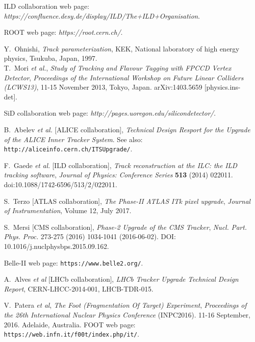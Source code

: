 \begin{thebibliography}{00}

 ILD collaboration web page: \\
{\it https://confluence.desy.de/display/ILD/The+ILD+Organisation}.

 ROOT web page: {\it https://root.cern.ch/}.

 Y.~Ohnishi, {\it Track  parameterization}, KEK, National laboratory of high energy physics, Tsukuba, Japan, 1997. \\

 T.~Mori {\it et al.}, {\it Study of Tracking and Flavour Tagging with FPCCD Vertex Detector}, 
{\it Proceedings of the International Workshop on Future Linear Colliders (LCWS13)}, 11-15 November 2013, Tokyo, Japan. 
arXiv:1403.5659 [physics.ins-det].

 SiD collaboration web page: {\it http://pages.uoregon.edu/silicondetector/}.

 B.~Abelev {\it et al.} [ALICE collaboration], {\it Technical Design Resport for the Upgrade of the ALICE Inner Tracker System}. 
See also: {\tt http://aliceinfo.cern.ch/ITSUpgrade/}.

 F.~Gaede {\it et al.} [ILD collaboration], {\it Track reconstruction at the ILC: the ILD tracking software}, 
{\it Journal of Physics: Conference Series} {\bf 513} (2014) 022011. doi:10.1088/1742-6596/513/2/022011.

 S.~Terzo [ATLAS collaboration], {\it The Phase-II ATLAS ITk pixel upgrade}, {\it Journal of Instrumentation}, Volume 12, July 2017.

 S.~Mersi [CMS collaboration], {\it Phase-2 Upgrade of the CMS Tracker}, {\it Nucl. Part. Phys. Proc.} 273-275 (2016) 1034-1041 (2016-06-02).
DOI: 10.1016/j.nuclphysbps.2015.09.162.

 Belle-II web page: {\tt https://www.belle2.org/}.

 A.~Alves {\it et al} [LHCb collaboration], {\it LHCb Tracker Upgrade Technical Design Report}, CERN-LHCC-2014-001, LHCB-TDR-015.

 V.~Patera {\it et al}, {\it The Foot (Fragmentation Of Target) Experiment}, {\it Proceedings of the 26th International Nuclear Physics Conference} 
(INPC2016). 11-16 September, 2016. Adelaide, Australia. FOOT web page: {\tt https://web.infn.it/f00t/index.php/it/}.


\end{thebibliography}
